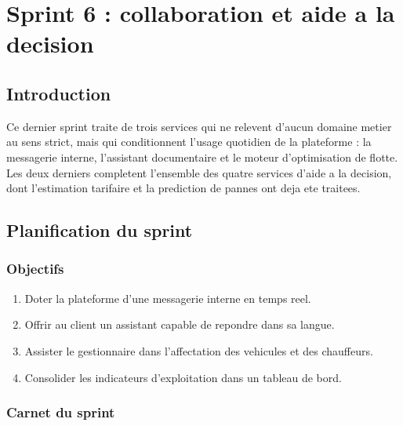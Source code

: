 \chapter{Sprint 6 : collaboration et aide a la decision}
\label{chap:sprint6}

\section*{Introduction}

Ce dernier sprint traite de trois services qui ne relevent d'aucun
domaine metier au sens strict, mais qui conditionnent l'usage quotidien
de la plateforme : la messagerie interne, l'assistant documentaire et le
moteur d'optimisation de flotte. Les deux derniers completent l'ensemble
des quatre services d'aide a la decision, dont l'estimation tarifaire et
la prediction de pannes ont deja ete traitees.

\section{Planification du sprint}

\subsection{Objectifs}

\begin{enumerate}
  \item Doter la plateforme d'une messagerie interne en temps reel.
  \item Offrir au client un assistant capable de repondre dans sa langue.
  \item Assister le gestionnaire dans l'affectation des vehicules et des
    chauffeurs.
  \item Consolider les indicateurs d'exploitation dans un tableau de
    bord.
\end{enumerate}

\subsection{Carnet du sprint}

